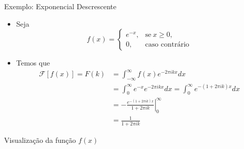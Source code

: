 \begin{frame}[fragile]{Exemplo: Exponencial Descrescente}

    \begin{itemize}
        \item Seja
        \[
            f(x) = \left\{ \begin{array}{cc}
                                e^{-x},& \mbox{se}\ x \geq 0,\\
                                0,& \mbox{caso contrário}
                        \end{array}\right.
        \]

        \item Temos que
        \begin{align*}
            \mathcal{F}[f(x)] = F(k) &= \int_{-\infty}^\infty f(x)e^{-2\pi ikx}dx \\
            &= \int_0^\infty e^{-x}e^{-2\pi ikx}dx = \int_0^\infty e^{-(1 + 2\pi ik)x}dx \\
            &= \left. -\frac{e^{-(1 + 2\pi ik)x}}{1 + 2\pi ik}\right|_0^\infty\\
            &= \frac{1}{1 + 2\pi ik}
        \end{align*}
    \end{itemize}

\end{frame}

\begin{frame}[fragile]{Visualização da função $f(x)$}

    \begin{figure}
        \centering

    \end{figure}

\end{frame}

